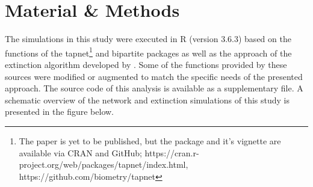 \documentclass[12pt,a4paper]{article}
\begin{document}

	\section{Material \& Methods}
	The simulations in this study were executed in R \parencite{Rcore} (version 3.6.3) based on the functions of the tapnet\footnote{The paper is yet to be published, but the package and it's vignette are available via CRAN and GitHub; https://cran.r-project.org/web/packages/tapnet/index.html, https://github.com/biometry/tapnet} \parencite{Benadi} and bipartite \parencite{Dormann2008} packages as well as the approach of the extinction algorithm developed by \citeauthor{Vizentin-Bugoni2019} \parencite{Vizentin-Bugoni2019}. Some of the functions provided by these sources were modified or augmented to match the specific needs of the presented approach. The source code of this analysis is available as a supplementary file. A schematic overview of the network and extinction simulations of this study is presented in the figure below.	
	
\end{document}
